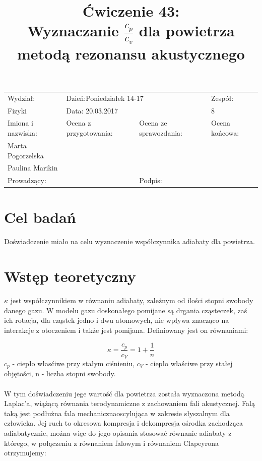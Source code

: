 \documentclass[a4paper,10pt]{article}
\def\arraystretch{1.2}
\begin{document}
\begin{table}
  \centering
  \def\arraystretch{1.5}
    \begin{tabular}{|l|l|l|l|} \hline
    Wydział:           & \multicolumn{2}{l|}{Dzień:Poniedziałek 14-17}    &Zespół:  \\
    Fizyki             &    \multicolumn{2}{l|}{Data: 20.03.2017}         &8             \\\hline
    Imiona i nazwiska: &Ocena z przygotowania:  &Ocena ze sprawozdania:   &Ocena końcowa: \\
    Marta Pogorzelska  &                        &                         &                \\
    Paulina Marikin    &                        &                         &\\\hline
    \multicolumn{2}{|l|}{Prowadzący:                 } &\multicolumn{2}{l|}{Podpis:             }  \\\hline
  \end{tabular}
\end{table}

\title{Ćwiczenie 43:\\Wyznaczanie $\frac{c_p}{c_v}$ dla powietrza metodą rezonansu akustycznego}
\date{}
\maketitle

\section{Cel badań}
Doświadczenie miało na celu wyznaczenie współczynnika adiabaty dla powietrza.

\section{Wstęp teoretyczny}
$\kappa$ jest współczynnikiem w równaniu adiabaty, zależnym od ilości stopni swobody danego gazu. W modelu gazu doskonałego pomijane są drgania cząsteczek, zaś ich rotacja, dla cząstek jedno i dwu atomowych, nie wpływa znacząco na interakcje z otoczeniem i także jest pomijana. Definiowany jest on równaniami:

\begin{equation}
  \kappa = \frac{c_p}{c_V} = 1+\frac{1}{n}
\end{equation}
$c_p$ - ciepło własćiwe przy stałym ciśnieniu, $c_V$ - ciepło właściwe przy stałej objętości, n - liczba stopni swobody.
\\\\W tym doświadczeniu jege wartość dla powietrza została wyznaczona metodą Laplac'a, wiążącą równania terodynamiczne z zachowaniem fali akustycznej. Falą taką jest podłużna fala mechanicznaoscylująca w zakresie słyszalnym dla człowieka. Jej ruch to okresowa kompresja i dekompresja ośrodka zachodząca adiabatycznie, można więc do jego opisania stosować równanie adiabaty z którego, w połączeniu z równaniem
falowym i równaniem Clapeyrona otrzymujemy:
\end{document}
